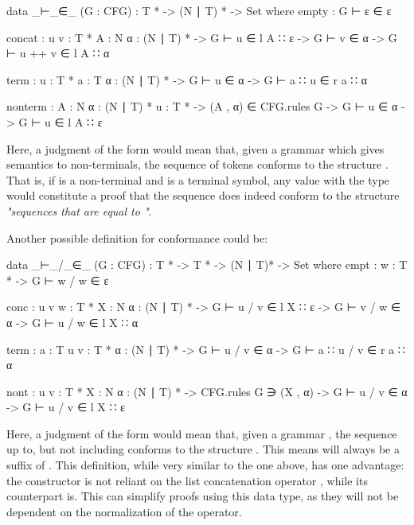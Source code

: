 	\begin{code}
		data _⊢_∈_ (G : CFG) :  T * -> (N ∣ T) * -> Set where
		  empty :
		    G ⊢ ε ∈ ε

		  concat : {u v : T *} {A : N} {α : (N ∣ T) *} ->
		    G ⊢ u ∈ l A ∷ ε -> G ⊢ v ∈ α -> G ⊢ u ++ v ∈ l A ∷ α

		  term : {u : T *} {a : T} {α : (N ∣ T) *} ->
		    G ⊢ u ∈ α -> G ⊢ a ∷ u ∈ r a ∷ α

		  nonterm : {A : N} {α : (N ∣ T) *} {u : T *} ->
		    (A , α) ∈ CFG.rules G -> G ⊢ u ∈ α -> G ⊢ u ∈ l A ∷ ε
	\end{code}

	Here, a judgment of the form  would mean that, given a
	grammar  which gives semantics to non-terminals, the sequence of
	tokens  conforms to the structure . That is, if
	 is a non-terminal and  is a terminal symbol, any value
	with the type  would constitute a proof
	that the sequence  does indeed conform to the structure
	\emph{"sequences that are equal to "}.

	Another possible definition for conformance could be:

	\begin{code}
		data _⊢_/_∈_ (G : CFG) : T * -> T * -> (N ∣ T)* -> Set where
		  empt : {w : T *} ->
		    G ⊢ w / w ∈ ε

		  conc : {u v w : T *} {X : N} {α : (N ∣ T) *} ->
		    G ⊢ u / v ∈ l X ∷ ε ->
		    G ⊢ v / w ∈ α ->
		      G ⊢ u / w ∈ l X ∷ α

		  term : {a : T} {u v : T *} {α : (N ∣ T) *} ->
		    G ⊢ u / v ∈ α ->
		      G ⊢ a ∷ u / v ∈ r a ∷ α

		  nont : {u v : T *} {X : N} {α : (N ∣ T) *} ->
		    CFG.rules G ∋ (X , α) ->
		    G ⊢ u / v ∈ α ->
		    G ⊢ u / v ∈ l X ∷ ε
	\end{code}

	Here, a judgment of the form  would mean that, given
	a grammar , the sequence  up to, but not including
	 conforms to the structure . This means  will
	always be a suffix of . This definition, while very similar to
	the one above, has one advantage: the constructor  is not
	reliant on the list concatenation operator \codett{++}, while its
	counterpart  is. This can simplify proofs using this data
	type, as they will not be dependent on the normalization of the \codett{++}
	operator.


